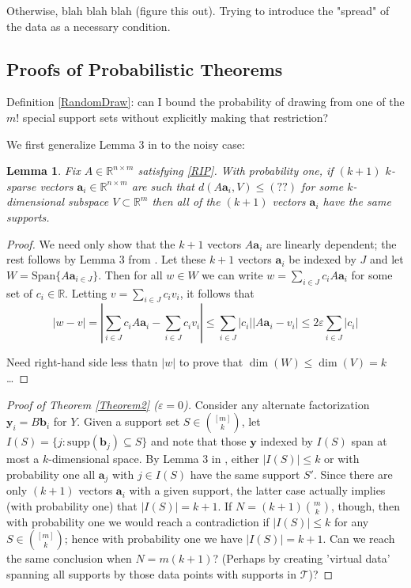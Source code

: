 \documentclass[journal, onecolumn]{IEEEtran}
\newtheorem{lemma}{Lemma}
\begin{document}
Otherwise, blah blah blah (figure this out). Trying to introduce the "spread" of the data as a necessary condition.


\subsection{Proofs of Probabilistic Theorems}\label{PUTproof}

Definition \ref{RandomDraw}: can I bound the probability of drawing from one of the $m!$ special support sets without explicitly making that restriction?

We first generalize Lemma 3 in \cite{Hillar15} to the noisy case:

\begin{lemma}
Fix $A \in \mathbb{R}^{n \times m}$ satisfying \eqref{RIP}. With probability one, if $(k+1)$ $k$-sparse vectors $\mathbf{a}_i \in \mathbb{R}^{n \times m}$ are such that $d(A\mathbf{a}_i,V) \leq (??)$ for some $k$-dimensional subspace $V \subset \mathbb{R}^m$ then all of the $(k+1)$ vectors $\mathbf{a}_i$ have the same supports.
\end{lemma}
\begin{proof}
We need only show that the $k+1$ vectors $A\mathbf{a}_i$ are linearly dependent; the rest follows by Lemma 3 from \cite{Hillar15}. Let these $k+1$ vectors $\mathbf{a}_i$ be indexed by $J$ and let $W = \text{Span}\{A\mathbf{a}_{i \in J}\}$. Then for all $w \in W$ we can write $w = \sum_{i \in J} c_iA\mathbf{a}_i$ for some set of $c_i \in \mathbb{R}$. Letting $v = \sum_{i \in J} c_iv_i$, it follows that
\[ |w - v| = |\sum_{i \in J} c_i A\mathbf{a}_i - \sum_{i \in J} c_i v_i | 
\leq \sum_{i \in J} |c_i| |A\mathbf{a}_i - v_i| \leq 2\varepsilon \sum_{i \in J}|c_i| \]

Need right-hand side less thatn $|w|$ to prove that $\dim(W) \leq \dim(V) = k$\ldots
\end{proof}

\begin{proof}[Proof of Theorem \ref{Theorem2} ($\varepsilon = 0$)]
Consider any alternate factorization $\mathbf{y}_i = B\mathbf{b}_i$ for $Y$. Given a support set $S \in {[m]\choose k}$, let $I(S) = \{j: \text{supp}(\mathbf{b}_j) \subseteq S\}$ and note that those $\mathbf{y}$ indexed by $I(S)$ span at most a $k$-dimensional space. By Lemma 3 in \cite{Hillar15}, either $|I(S)| \leq k$ or with probability one all $\mathbf{a}_j$ with $j \in I(S)$ have the same support $S'$. Since there are only $(k+1)$ vectors $\mathbf{a}_i$ with a given support, the latter case actually implies (with probability one) that $|I(S)| = k+1$. If $N=(k+1){m \choose k}$, though, then with probability one we would reach a contradiction if $|I(S)| \leq k$ for any $S \in {[m] \choose k}$; hence with probability one we have $|I(S)| = k+1$. Can we reach the same conclusion when $N = m(k+1)$? (Perhaps by creating 'virtual data' spanning all supports by those data points with supports in $\mathcal{T}$)?

\end{proof}
\end{document}

